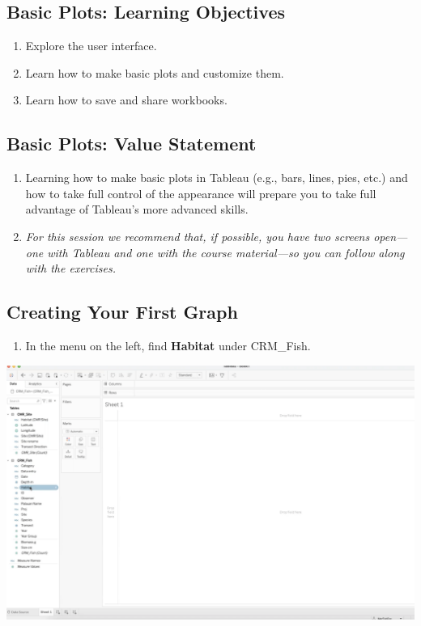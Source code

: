 \documentclass[
]{book}
\providecommand{\tightlist}{%
  \setlength{\itemsep}{0pt}\setlength{\parskip}{0pt}}
\begin{document}
\hypertarget{basic-plots-learning-objectives}{%
\subsection{Basic Plots: Learning Objectives}\label{basic-plots-learning-objectives}}

\begin{enumerate}
\def\labelenumi{\arabic{enumi}.}
\item
  Explore the user interface.
\item
  Learn how to make basic plots and customize them.
\item
  Learn how to save and share workbooks.
\end{enumerate}

\hypertarget{basic-plots-value-statement}{%
\subsection{Basic Plots: Value Statement}\label{basic-plots-value-statement}}

\begin{enumerate}
\def\labelenumi{\arabic{enumi}.}
\item
  Learning how to make basic plots in Tableau (e.g., bars, lines, pies, etc.) and how to take full control of the appearance will prepare you to take full advantage of Tableau's more advanced skills.
\item
  \emph{For this session we recommend that, if possible, you have two screens open---one with Tableau and one with the course material---so you can follow along with the exercises.}
\end{enumerate}

\hypertarget{creating-your-first-graph}{%
\subsection{Creating Your First Graph}\label{creating-your-first-graph}}

\begin{enumerate}
\def\labelenumi{\arabic{enumi}.}
\tightlist
\item
  In the menu on the left, find \textbf{Habitat} under CRM\_Fish.
\end{enumerate}

\includegraphics{images/M3S2_find-habitat.png}
\end{document}
